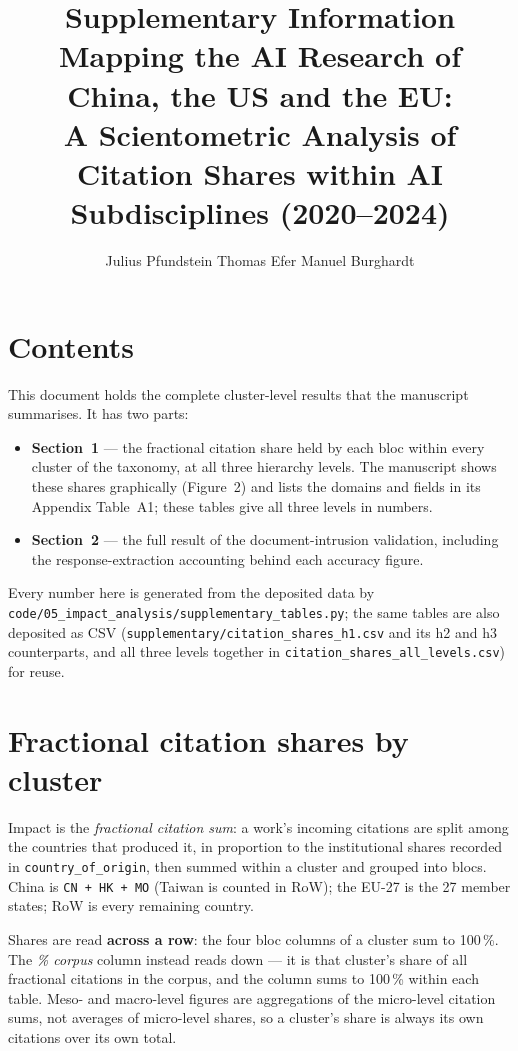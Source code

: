 \documentclass[a4paper,10pt]{article}
\title{Supplementary Information\\
{\large Mapping the AI Research of China, the US and the EU:}\\
{\large A Scientometric Analysis of Citation Shares within AI Subdisciplines (2020--2024)}}
\author{Julius Pfundstein \quad Thomas Efer \quad Manuel Burghardt}
\date{}
\begin{document}
\color{darkergray}
\maketitle

\section*{Contents}

This document holds the complete cluster-level results that the manuscript
summarises. It has two parts:

\begin{itemize}
  \item \textbf{Section~1} --- the fractional citation share held by each bloc
  within every cluster of the taxonomy, at all three hierarchy levels. The
  manuscript shows these shares graphically (Figure~2) and lists the domains
  and fields in its Appendix Table~A1; these tables give all three levels in
  numbers.
  \item \textbf{Section~2} --- the full result of the document-intrusion
  validation, including the response-extraction accounting behind each
  accuracy figure.
\end{itemize}

Every number here is generated from the deposited data by
\texttt{code/05\_impact\_analysis/supplementary\_tables.py}; the same tables are
also deposited as CSV (\texttt{supplementary/citation\_shares\_h1.csv} and its
h2 and h3 counterparts, and all three levels together in
\texttt{citation\_shares\_all\_levels.csv}) for reuse.

\section{Fractional citation shares by cluster}

Impact is the \textit{fractional citation sum}: a work's incoming citations are
split among the countries that produced it, in proportion to the institutional
shares recorded in \texttt{country\_of\_origin}, then summed within a cluster and
grouped into blocs. China is \texttt{CN + HK + MO} (Taiwan is counted in RoW); the EU-27 is the 27
member states; RoW is every remaining country.

Shares are read \textbf{across a row}: the four bloc columns of a cluster sum to
100\,\%. The \textit{\% corpus} column instead reads down --- it is that
cluster's share of all fractional citations in the corpus, and the column sums
to 100\,\% within each table. Meso- and macro-level figures are aggregations of
the micro-level citation sums, not averages of micro-level shares, so a
cluster's share is always its own citations over its own total.
\end{document}
